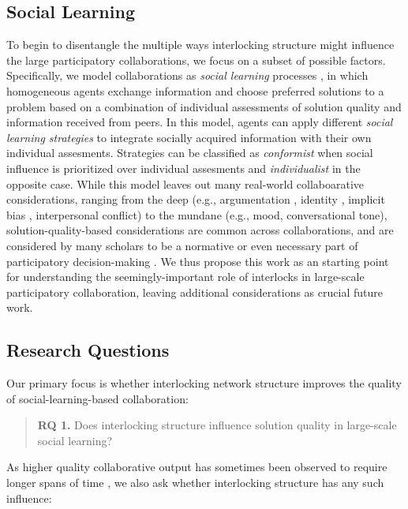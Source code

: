 \documentclass[manuscript,screen,review,acmsmall]{acmart}
\begin{document}
\subsection{Social Learning}
To begin to disentangle the multiple ways interlocking structure might influence the large participatory collaborations,
we focus on a subset of possible factors.
Specifically, we model collaborations as {\em social learning} processes \cite{barkoczi_social_2016, mason_collaborative_2012, hong_interpreted_2009, degroot_reaching_1974},
in which homogeneous agents exchange information and choose preferred solutions to a problem based on a combination of individual assessments of solution quality and information received from peers.
In this model, agents can apply different
{\em social learning strategies} to integrate socially acquired information with their own individual assesments.
Strategies can be classified as {\em conformist} when social influence is prioritized over individual assesments and {\em individualist} in the opposite case.
While this model leaves out many real-world collaboarative considerations,
ranging from the deep
(e.g.,
argumentation \cite{fishkin_voice_1997, mansbridge_minimalist_2015},
identity \cite{bail_breaking_2022,schkade_what_2007},
implicit bias \cite{amodio_stereotyping_2006},
interpersonal conflict\cite{whiting_did_2019})
to the mundane (e.g.,
mood, 
conversational tone),
solution-quality-based considerations are common across collaborations,
and are considered by many scholars to be a normative or even necessary
part of participatory decision-making
\cite{mansbridge_minimalist_2015}.
We thus propose this work as an starting point for understanding the seemingly-important role of interlocks in large-scale participatory collaboration, leaving additional considerations as crucial future work.

\subsection{Research Questions}
Our primary focus is whether interlocking network structure improves the quality of social-learning-based collaboration:
\begin{quote}
{\bfseries RQ 1.} Does interlocking structure influence solution quality in large-scale social learning?
\end{quote}

As higher quality collaborative output has sometimes been observed to require longer spans of time
\cite{
gentry_consensus_1982,
platt_network_2018},
we also ask whether interlocking structure
has any such influence:
\end{document}
